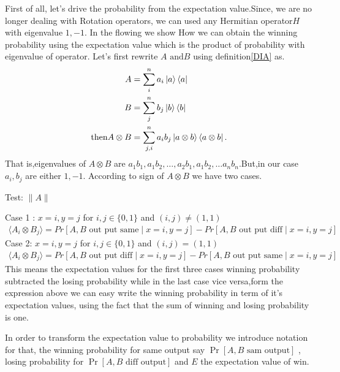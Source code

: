 First of all, let's drive the probability from the expectation value.Since, we are no longer dealing with Rotation operators, we can used any Hermitian  operator$H$ with eigenvalue $1,-1$. In the flowing we show How we can obtain the winning probability using the expectation value which is the product  of probability with  eigenvalue of operator.
Let's first rewrite $A\text{ and} B$ using definition\ref{DIA} as.
\begin{align}\label{NEED}
A&=\sum_i^n a_i \ket{a}\bra{a}\nonumber\\
B&=\sum_j^n  b_j \ket{b}\bra{b}\nonumber\\
\text{then} A\otimes B&=\sum_{j,i}^n  a_i b_j \ket{a\otimes b}\bra{a \otimes b}.
\end{align}
That is,eigenvalues of $A\otimes B$ are $a_1 b_1 ,a_1b_2,\dots,a_2 b_1,a_1 b_2,\dots a_n b_n$.But,in our case $a_i,b_j$ are either $1,-1$. According to sign of $A\otimes B$ we have two cases.



Test:
$\|A\|$%

Case 1 :
$x=i,y=j$ for $i,j\in \{0,1\}$ and $(i,j)\neq (1,1)$
\begin{align*}
\langle A_i\otimes B_j \rangle=Pr[A,B \text{ out put same} \mid  x=i,y=j]-Pr[A,B \text{ out put diff}  \mid  x=i,y=j]
\end{align*}
Case 2:
$x=i,y=j$ for $i,j\in \{0,1\}$ and $(i,j)= (1,1)$
\begin{align*}
\langle A_i\otimes B_j\rangle=Pr[A,B \text{ out put diff} \mid  x=i,y=j]-Pr[A,B \text{ out put same}  \mid  x=i,y=j]
\end{align*}
This means the expectation values for  the first three  cases winning probability subtracted  the losing probability while in the last case vice versa,form the expression above we can easy write the winning probability in term of it's expectation values, using the fact that the sum of winning and losing probability  is one.

In order to transform the expectation value to probability we introduce notation for that, the winning probability for same output say $\Pr[A,B \text{ sam output}]$ , losing probability for $\Pr[A,B \text{ diff output}]$ and $E$ the expectation value of win.

